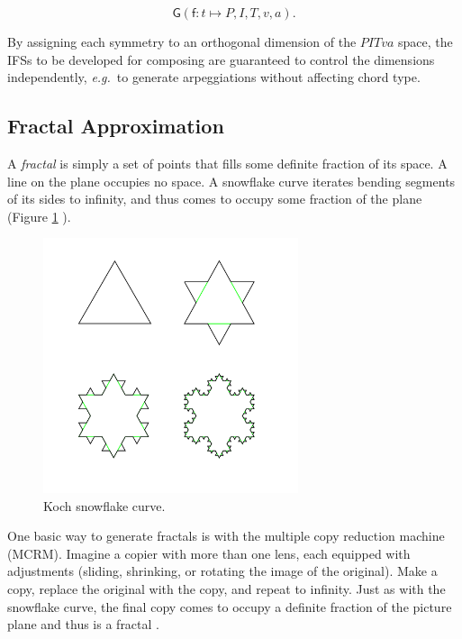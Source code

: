 \documentclass[english,11pt,letterpaper,onecolumn]{scrartcl}
\numberwithin{equation}{section}
\begin{document}
$$\mathsf{G}(\mathsf{f}: t \mapsto P, I, T, v, a).$$

By assigning each symmetry to an orthogonal dimension of the $PITva$ space, the
IFSs to be developed for composing are guaranteed to control the dimensions
independently, \textit{e.g.}\ to generate arpeggiations without affecting
chord type.

\subsection{Fractal Approximation}

A \textit{fractal} is simply a set of points that fills some definite fraction
of its space. A line on the plane occupies no space. A snowflake curve
iterates bending segments of its sides to infinity, and thus comes to occupy
some fraction of the plane (Figure \ref{fig:kochflake}
\cite{Mandelbrot:1982:FGN}).

\begin{figure}
\centerline{\includegraphics[width = 0.6667\textwidth]{KochFlake}}
\caption{\label{fig:kochflake} Koch snowflake
curve.\protect\footnotemark}
\end{figure}


One basic way to generate fractals is with the multiple copy reduction
machine (MCRM). Imagine a copier with more than one lens, each equipped with
adjustments (sliding, shrinking, or rotating the image of the original). Make
a copy, replace the original with the copy, and repeat to infinity. Just as
with the snowflake curve, the final copy comes to occupy a definite fraction
of the picture plane and thus is a fractal \cite{chaosandfractals}.
\end{document}
